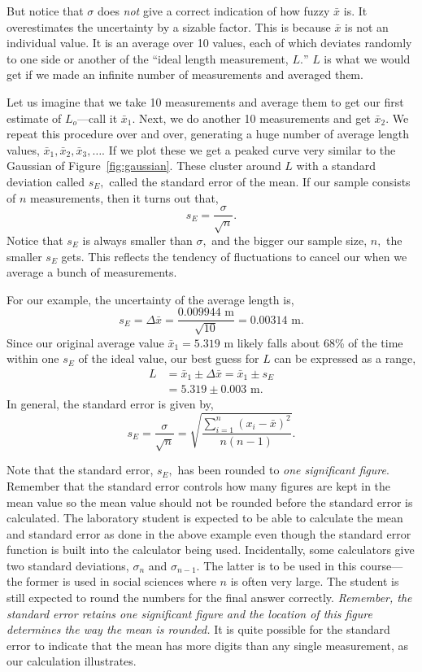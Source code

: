 \documentclass[main.tex]{subfiles}
\begin{document}
But notice that $\sigma$ does \emph{not} give a correct indication of how fuzzy $\bar{x}$ is. It overestimates the uncertainty by a sizable factor. This is because $\bar{x}$ is not an individual value. It is an average over 10 values, each of which deviates randomly to one side or another of the ``ideal length measurement, $L.$'' $L$ is what we would get if we made an infinite number of measurements and averaged them.

Let us imagine that we take 10 measurements and average them to get our first estimate of $L_o$---call it $\bar{x}_1.$ Next, we do another 10 measurements and get $\bar{x}_2.$ We repeat this procedure over and over, generating a huge number of average length values, $\bar{x}_1,\bar{x}_2,\bar{x}_3,\dotsc.$ If we plot these we get a peaked curve very similar to the Gaussian of Figure~\ref{fig:gaussian}. These cluster around $L$ with a standard deviation called $s_E,$ called the standard error of the mean. If our sample consists of $n$ measurements, then it turns out that,
\[
s_E=\frac{\sigma}{\sqrt{n}}.
\]
Notice that $s_E$ is always smaller than $\sigma,$ and the bigger our sample size, $n,$ the smaller $s_E$ gets. This reflects the tendency of fluctuations to cancel our when we average a bunch of measurements.

For our example, the uncertainty of the average length is,
\[
s_E=\Delta\bar{x}=\frac{0.009944\text{ m}}{\sqrt{10}}=0.00314\text{ m}.
\]
Since our original average value $\bar{x}_1=5.319\text{ m}$ likely falls about 68\% of the time within one $s_E$ of the ideal value, our best guess for $L$ can be expressed as a range,
\begin{align*}
L&=\bar{x}_1\pm\Delta\bar{x}=\bar{x}_1\pm s_E\\
&=5.319\pm0.003\text{ m}.
\end{align*}
In general, the standard error is given by,
\[
s_E=\frac{\sigma}{\sqrt{n}}=\sqrt{\frac{\sum_{i=1}^{n}(x_i-\bar{x})^2}{n(n-1)}}.
\]

Note that the standard error, $s_E,$ has been rounded to \emph{one significant figure}.  Remember that the standard error controls how many figures are kept in the mean value so the mean value should not be rounded before the standard error is calculated.  The laboratory student is expected to be able to calculate the mean and standard error as done in the above example even though the standard error function is built into the calculator being used.   Incidentally, some calculators give two standard deviations, $\sigma_{n}$ and $\sigma_{n-1}.$  The latter is to be used in this course---the former is used in social sciences where $n$ is often very large.  The student is still expected to round the numbers for the final answer correctly.  \emph{Remember, the standard error retains one significant figure and the location of this figure determines the way the mean is rounded.}  It is quite possible for the standard error to indicate that the mean has more digits than any single measurement, as our calculation illustrates.
\end{document}
